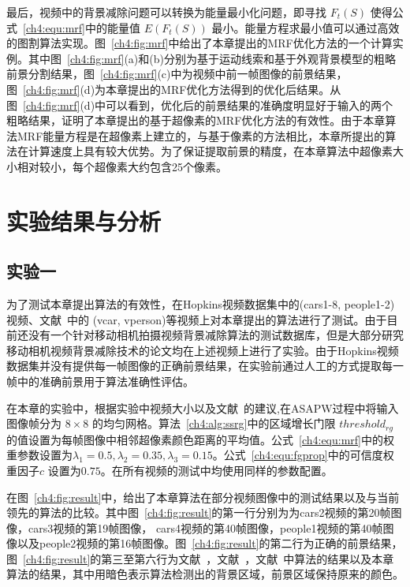 最后，视频中的背景减除问题可以转换为能量最小化问题，即寻找 $F_{t}(S)$ 使得公式~\ref{ch4:equ:mrf}中的能量值 $E(F_{t}(S))$ 最小。能量方程求最小值可以通过高效的图割算法\cite{graphcut04}实现。图~\ref{ch4:fig:mrf}中给出了本章提出的MRF优化方法的一个计算实例。其中图~\ref{ch4:fig:mrf}(a)和(b)分别为基于运动线索和基于外观背景模型的粗略前景分割结果，图~\ref{ch4:fig:mrf}(c)中为视频中前一帧图像的前景结果，图~\ref{ch4:fig:mrf}(d)为本章提出的MRF优化方法得到的优化后结果。从图~\ref{ch4:fig:mrf}(d)中可以看到，优化后的前景结果的准确度明显好于输入的两个粗略结果，证明了本章提出的基于超像素的MRF优化方法的有效性。由于本章算法MRF能量方程是在超像素上建立的，与基于像素的方法\cite{Multitransform,SubspaceTracking}相比，本章所提出的算法在计算速度上具有较大优势。为了保证提取前景的精度，在本章算法中超像素大小相对较小，每个超像素大约包含25个像素。 \par


 \section{实验结果与分析}
 \label{ch4:sec:results}
 \subsection{实验一}
 \label{ch4:sec:sub:test1}

为了测试本章提出算法的有效性，在Hopkins视频数据集\cite{HopKinsDataSet}中的(cars1-8, people1-2)视频、文献~中的 (vcar, vperson)等视频上对本章提出的算法进行了测试。由于目前还没有一个针对移动相机拍摄视频背景减除算法的测试数据库，但是大部分研究移动相机视频背景减除技术的论文均在上述视频上进行了实验\cite{iccv2009,LimPRFloating,Multitransform,kwak2011Generalized}。由于Hopkins视频数据集并没有提供每一帧图像的正确前景结果，在实验前通过人工的方式提取每一帧中的准确前景用于算法准确性评估。\par
在本章的实验中，根据实验中视频大小以及文献~\cite{Liu_2013ASAP}的建议,在ASAPW过程中将输入图像帧分为 $8\times8$ 的均匀网格。算法~\ref{ch4:alg:ssrg}中的区域增长门限 $threshold_{rg}$ 的值设置为每帧图像中相邻超像素颜色距离的平均值。公式~\ref{ch4:equ:mrf}中的权重参数设置为$\lambda_{1} = 0.5, \lambda_{2} = 0.35, \lambda_{3} = 0.15$。公式~\ref{ch4:equ:fgprop}中的可信度权重因子$c$ 设置为$0.75$。在所有视频的测试中均使用同样的参数配置。 \par
在图~\ref{ch4:fig:result}中，给出了本章算法在部分视频图像中的测试结果以及与当前领先的算法\cite{kwak2011Generalized,Multitransform,5.8s}的比较。其中图~\ref{ch4:fig:result}的第一行分别为为cars2视频的第20帧图像，cars3视频的第19帧图像， cars4视频的第40帧图像，people1视频的第40帧图像以及people2视频的第16帧图像。图~\ref{ch4:fig:result}的第二行为正确的前景结果，图~\ref{ch4:fig:result}的第三至第六行为文献~，文献~，文献~中算法的结果以及本章算法的结果，其中用暗色表示算法检测出的背景区域，前景区域保持原来的颜色。

